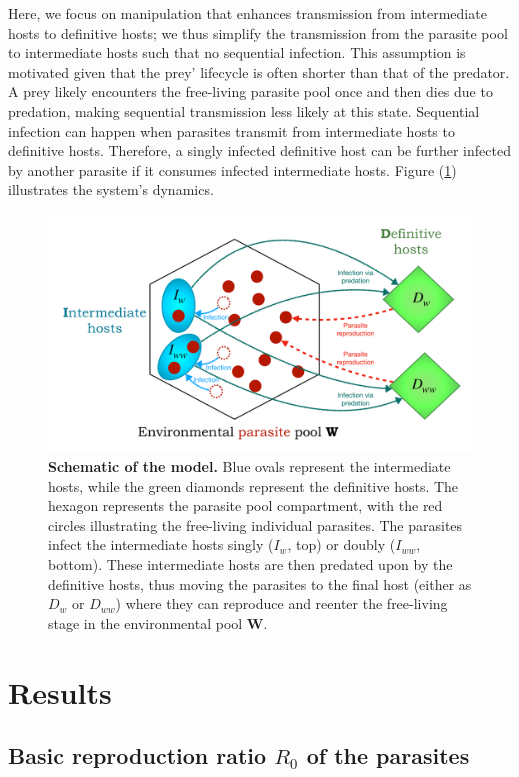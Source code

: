 \documentclass[a4paper]{scrartcl}
\begin{document}
Here, we focus on manipulation that enhances transmission from intermediate hosts to definitive hosts; we thus simplify the transmission from the parasite pool to intermediate hosts such that no sequential infection. 
This assumption is motivated given that the prey' lifecycle is often shorter than that of the predator. 
A prey likely encounters the free-living parasite pool once and then dies due to predation, making sequential transmission less likely at this state.
Sequential infection can happen when parasites transmit from intermediate hosts to definitive hosts. 
Therefore, a singly infected definitive host can be further infected by another parasite if it consumes infected intermediate hosts. 
Figure (\ref{fig:schematic}) illustrates the system's dynamics.
%
\begin{figure}[ht!]
\captionsetup{format=plain}
\centering
\includegraphics[width=\textwidth]{Figures/schematic.pdf}
\caption{\textbf{Schematic of the model.} 
Blue ovals represent the intermediate hosts, while the green diamonds represent the definitive hosts.
The hexagon represents the parasite pool compartment, with the red circles illustrating the free-living individual parasites.
The parasites infect the intermediate hosts singly ($I_w$, top) or doubly ($I_{ww}$, bottom).
These intermediate hosts are then predated upon by the definitive hosts, thus moving the parasites to the final host (either as $D_w$ or $D_{ww}$) where they can reproduce and reenter the free-living stage in the environmental pool $\mathbf{W}$.
}
\label{fig:schematic}
\end{figure}

\section*{Results}
\subsection*{Basic reproduction ratio $R_0$ of the parasites}
\end{document}
